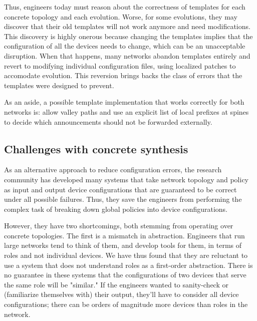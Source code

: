 \documentclass{sig-alternate-10pt}
\begin{document}
Thus, engineers today must reason about the correctness of templates for each concrete topology and each evolution. Worse, for some evolutions, they may discover that their old templates will not work anymore and need modifications. This discovery is highly onerous because changing the templates implies that the configuration of all the devices needs to change, which can be an unacceptable disruption.  When that happens, many networks abandon templates entirely and revert to modifying individual configuration files, using localized patches to accomodate evolution. This reversion brings backs the class of errors that the templates were designed to prevent.

As an aside, a possible template implementation that works correctly for both networks is: allow valley paths and use an explicit list of local prefixes at spines to decide which announcements should not be forwarded externally.

\subsection{Challenges with concrete synthesis}

As an alternative approach to reduce configuration errors, the research community has developed many systems that take network topology and policy as input and output device configurations that are  guaranteed to be correct under all possible failures. Thus, they save the engineers from performing the complex task of breaking down global policies into device configurations.

However, they have two shortcomings, both stemming from operating over concrete topologies. The first is a mismatch in abstraction. Engineers that run large networks tend to think of them, and develop tools for them, in terms of roles and not individual devices. We have thus found that they are reluctant to use a system that does not understand roles as a first-order abstraction. There is no guarantee in these systems that the configurations of two devices that serve the same role will be "similar."  If the engineers wanted to sanity-check or (familiarize themselves with) their output, they'll have to consider all device configurations;  there can be orders of magnitude more devices than roles in the network.
\end{document}
